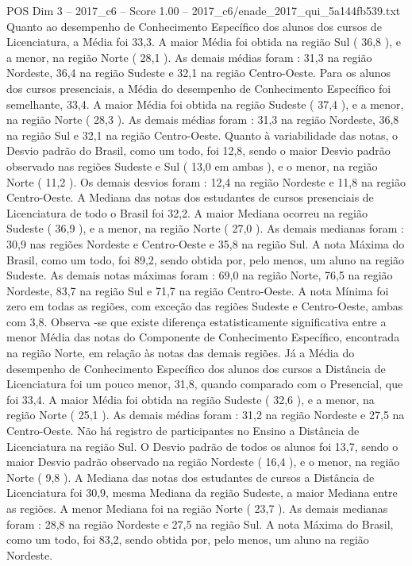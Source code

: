 \begin{textsample}{POS Dim 3 – 2017\_c6 – Score 1.00 – 2017\_c6/enade\_2017\_qui\_5a144fb539.txt}
Quanto ao desempenho de Conhecimento Específico dos alunos dos cursos de Licenciatura, a Média foi 33,3.
A maior Média foi obtida na região Sul ( 36,8 ), e a menor, na região Norte ( 28,1 ).
As demais médias foram : 31,3 na região Nordeste, 36,4 na região Sudeste e 32,1 na região Centro-Oeste.
Para os alunos dos cursos presenciais, a Média do desempenho de Conhecimento Específico foi semelhante, 33,4.
A maior Média foi obtida na região Sudeste ( 37,4 ), e a menor, na região Norte ( 28,3 ).
As demais médias foram : 31,3 na região Nordeste, 36,8 na região Sul e 32,1 na região Centro-Oeste.
Quanto à variabilidade das notas, o Desvio padrão do Brasil, como um todo, foi 12,8, sendo o maior Desvio padrão observado nas regiões Sudeste e Sul ( 13,0 em ambas ), e o menor, na região Norte ( 11,2 ).
Os demais desvios foram : 12,4 na região Nordeste e 11,8 na região Centro-Oeste.
A Mediana das notas dos estudantes de cursos presenciais de Licenciatura de todo o Brasil foi 32,2.
A maior Mediana ocorreu na região Sudeste ( 36,9 ), e a menor, na região Norte ( 27,0 ).
As demais medianas foram : 30,9 nas regiões Nordeste e Centro-Oeste e 35,8 na região Sul.
A nota Máxima do Brasil, como um todo, foi 89,2, sendo obtida por, pelo menos, um aluno na região Sudeste.
As demais notas máximas foram : 69,0 na região Norte, 76,5 na região Nordeste, 83,7 na região Sul e 71,7 na região Centro-Oeste.
A nota Mínima foi zero em todas as regiões, com exceção das regiões Sudeste e Centro-Oeste, ambas com 3,8.
Observa -se que existe diferença estatisticamente significativa entre a menor Média das notas do Componente de Conhecimento Específico, encontrada na região Norte, em relação às notas das demais regiões.
Já a Média do desempenho de Conhecimento Específico dos alunos dos cursos a Distância de Licenciatura foi um pouco menor, 31,8, quando comparado com o Presencial, que foi 33,4.
A maior Média foi obtida na região Sudeste ( 32,6 ), e a menor, na região Norte ( 25,1 ).
As demais médias foram : 31,2 na região Nordeste e 27,5 na Centro-Oeste.
Não há registro de participantes no Ensino a Distância de Licenciatura na região Sul.
O Desvio padrão de todos os alunos foi 13,7, sendo o maior Desvio padrão observado na região Nordeste ( 16,4 ), e o menor, na região Norte ( 9,8 ).
A Mediana das notas dos estudantes de cursos a Distância de Licenciatura foi 30,9, mesma Mediana da região Sudeste, a maior Mediana entre as regiões.
A menor Mediana foi na região Norte ( 23,7 ).
As demais medianas foram : 28,8 na região Nordeste e 27,5 na região Sul.
A nota Máxima do Brasil, como um todo, foi 83,2, sendo obtida por, pelo menos, um aluno na região Nordeste.

\end{textsample}
